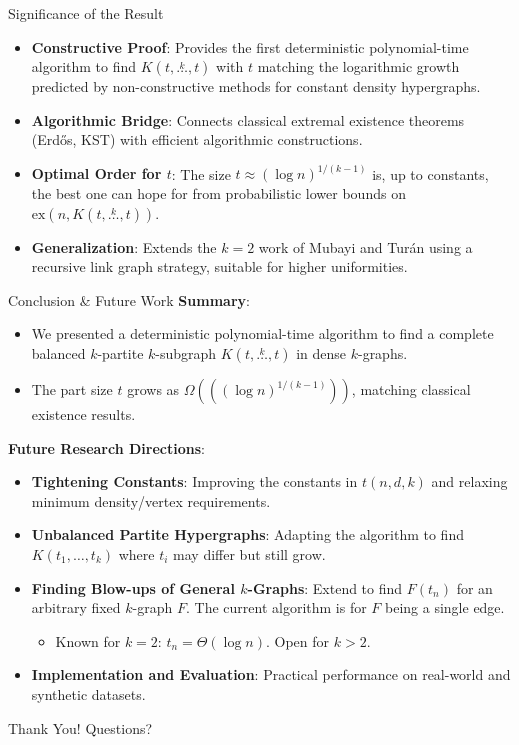 \documentclass{beamer}
\newcommand{\ex}[2]{\ensuremath{\text{ex} \left( #1, #2 \right)}}
\newcommand{\compoverset}[2]{\ensuremath{K\left(#2, \overset{#1}{\dots}, #2\right)}} %
\newcommand{\compdots}[2]{\ensuremath{K\left(#1, \dots, #2\right)}} %
\newcommand{\OmegaBig}[1]{\ensuremath{\Omega\left(#1\right)}} %
\begin{document}
\begin{frame}{Significance of the Result}
  \begin{itemize}
    \item \textbf{Constructive Proof}: Provides the first deterministic polynomial-time algorithm to find $\compoverset{k}{t}$ with $t$ matching the logarithmic growth predicted by non-constructive methods for constant density hypergraphs.
    \pause
    \item \textbf{Algorithmic Bridge}: Connects classical extremal existence theorems (Erdős, KST) with efficient algorithmic constructions.
    \pause
    \item \textbf{Optimal Order for $t$}: The size $t \approx (\log n)^{1/(k-1)}$ is, up to constants, the best one can hope for from probabilistic lower bounds on $\ex{n}{\compoverset{k}{t}}$.
    \pause
    \item \textbf{Generalization}: Extends the $k=2$ work of Mubayi and Turán using a recursive link graph strategy, suitable for higher uniformities.
  \end{itemize}
\end{frame}

\begin{frame}{Conclusion & Future Work}
  \textbf{Summary}:
  \begin{itemize}
    \item We presented a deterministic polynomial-time algorithm to find a complete balanced $k$-partite $k$-subgraph $\compoverset{k}{t}$ in dense $k$-graphs.
    \item The part size $t$ grows as $\OmegaBig{((\log n)^{1/(k-1)})}$, matching classical existence results.
  \end{itemize}
  \pause
  \textbf{Future Research Directions}:
  \begin{itemize}
    \item \textbf{Tightening Constants}: Improving the constants in $t(n,d,k)$ and relaxing minimum density/vertex requirements.
    \item \textbf{Unbalanced Partite Hypergraphs}: Adapting the algorithm to find $\compdots{t_1}{t_k}$ where $t_i$ may differ but still grow.
    \item \textbf{Finding Blow-ups of General $k$-Graphs}: Extend to find $F(t_n)$ for an arbitrary fixed $k$-graph $F$. The current algorithm is for $F$ being a single edge.
        \begin{itemize}
            \item Known for $k=2$: $t_n = \Theta(\log n)$. Open for $k > 2$.
        \end{itemize}
    \item \textbf{Implementation and Evaluation}: Practical performance on real-world and synthetic datasets.
  \end{itemize}
\end{frame}

\begin{frame}
  \centering
  \Huge Thank You!
  \bigskip
  \Large Questions?
\end{frame}
\end{document}
